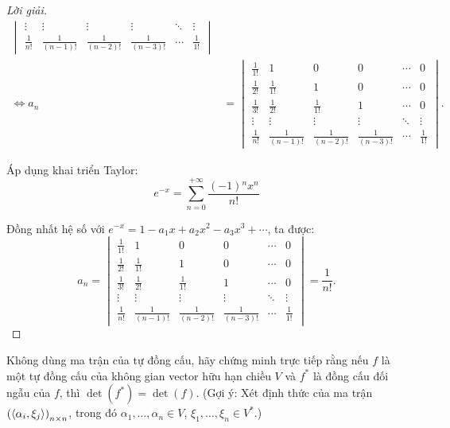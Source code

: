 \documentclass[class=nhvh-linear-algebra,crop=false]{standalone}
\begin{document}
\begin{proof}[Lời giải]
\begin{align*}
\begin{vmatrix}
            \vdots       & \vdots           & \vdots           & \vdots           & \ddots & \vdots       \\
            \frac{1}{n!} & \frac{1}{(n-1)!} & \frac{1}{(n-2)!} & \frac{1}{(n-3)!} & \cdots & \frac{1}{1!}
        \end{vmatrix}  \\
        \Longleftrightarrow a_{n} & =
        \begin{vmatrix}
            \frac{1}{1!} & 1                & 0                & 0                & \cdots & 0            \\
            \frac{1}{2!} & \frac{1}{1!}     & 1                & 0                & \cdots & 0            \\
            \frac{1}{3!} & \frac{1}{2!}     & \frac{1}{1!}     & 1                & \cdots & 0            \\
            \vdots       & \vdots           & \vdots           & \vdots           & \ddots & \vdots       \\
            \frac{1}{n!} & \frac{1}{(n-1)!} & \frac{1}{(n-2)!} & \frac{1}{(n-3)!} & \cdots & \frac{1}{1!}
        \end{vmatrix}.
    \end{align*}

    \par Áp dụng khai triển Taylor:
    \[
        e^{-x} = \sum^{+\infty}_{n=0}\frac{(-1){}^{n}x^{n}}{n!}
    \]
    \par Đồng nhất hệ số với $e^{-x} = 1 - a_{1}x + a_{2}x^{2} - a_{3}x^{3} + \cdots$, ta được:
    \[
        a_{n} =
        \begin{vmatrix}
            \frac{1}{1!} & 1                & 0                & 0                & \cdots & 0            \\
            \frac{1}{2!} & \frac{1}{1!}     & 1                & 0                & \cdots & 0            \\
            \frac{1}{3!} & \frac{1}{2!}     & \frac{1}{1!}     & 1                & \cdots & 0            \\
            \vdots       & \vdots           & \vdots           & \vdots           & \ddots & \vdots       \\
            \frac{1}{n!} & \frac{1}{(n-1)!} & \frac{1}{(n-2)!} & \frac{1}{(n-3)!} & \cdots & \frac{1}{1!}
        \end{vmatrix}
        = \frac{1}{n!}.
    \]
\end{proof}

\begin{exercise}
    \par Không dùng ma trận của tự đồng cấu, hãy chứng minh trực tiếp rằng nếu $f$ là một tự đồng cấu của không gian vector hữu hạn chiều $V$ và $f^{*}$ là đồng cấu đối ngẫu của $f$, thì $\det(f^{*}) = \det(f)$. (Gợi ý: Xét định thức của ma trận ${\left(\left\langle{\alpha_{i},\xi_{j}}\right\rangle\right)}_{n\times n}$, trong đó $\alpha_{1},\ldots,\alpha_{n}\in V$, $\xi_{1},\ldots ,\xi_{n}\in V^{*}$.)
\end{exercise}
\end{document}
